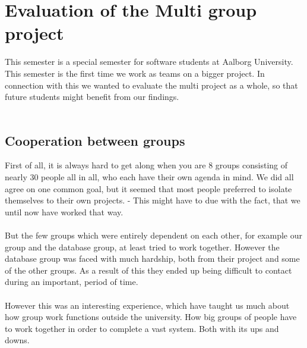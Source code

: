\section{Evaluation of the Multi group project}
\label{sec:multiEval}
This semester is a special semester for software students at Aalborg University. This semester is the first time we work as teams on a bigger project. In connection with this we wanted to evaluate the multi project as a whole, so that future students might benefit from our findings.\\
\\
\subsection{Cooperation between groups}
First of all, it is always hard to get along when you are 8 groups consisting of nearly 30 people all in all, who each have their own agenda in mind. We did all agree on one common goal, but it seemed that most people preferred to isolate themselves to their own projects. - This might have to due with the fact, that we until now have worked that way.\\
\\
But the few groups which were entirely dependent on each other, for example our group and the database group, at least tried to work together. However the database group was faced with much hardship, both from their project and some of the other groups. As a result of this they ended up being difficult to contact during an important, period of time.\\
\\
However this was an interesting experience, which have taught us much about how group work functions outside the university. How big groups of people have to work together in order to complete a vast system. Both with its ups and downs.

